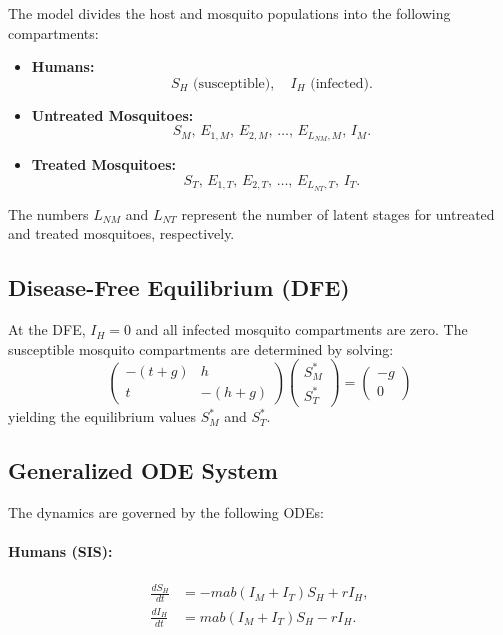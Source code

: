 \documentclass[12pt]{article}
\begin{document}
The model divides the host and mosquito populations into the following compartments:
\begin{itemize}
    \item \textbf{Humans:}
    \[
    S_H \text{ (susceptible)}, \quad I_H \text{ (infected)}.
    \]
    \item \textbf{Untreated Mosquitoes:}
    \[
    S_M,\, E_{1,M},\, E_{2,M},\, \dots,\, E_{L_{NM},M},\, I_M.
    \]
    \item \textbf{Treated Mosquitoes:}
    \[
    S_T,\, E_{1,T},\, E_{2,T},\, \dots,\, E_{L_{NT},T},\, I_T.
    \]
\end{itemize}
The numbers \(L_{NM}\) and \(L_{NT}\) represent the number of latent stages for untreated and treated mosquitoes, respectively.

\subsection{Disease-Free Equilibrium (DFE)}

At the DFE, \(I_H = 0\) and all infected mosquito compartments are zero. The susceptible mosquito compartments are determined by solving:
\[
\begin{pmatrix}
-(t + g) & h \\
t & -(h+g)
\end{pmatrix}
\begin{pmatrix}
S_M^* \\ S_T^*
\end{pmatrix}
=
\begin{pmatrix}
-g \\ 0
\end{pmatrix}
\]
yielding the equilibrium values \(S_M^*\) and \(S_T^*\).

\subsection{Generalized ODE System}

The dynamics are governed by the following ODEs:

\paragraph{Humans (SIS):}
\begin{align*}
\frac{dS_H}{dt} &= -m a b (I_M + I_T) S_H + r I_H, \\
\frac{dI_H}{dt} &= m a b (I_M + I_T) S_H - r I_H.
\end{align*}
\end{document}
